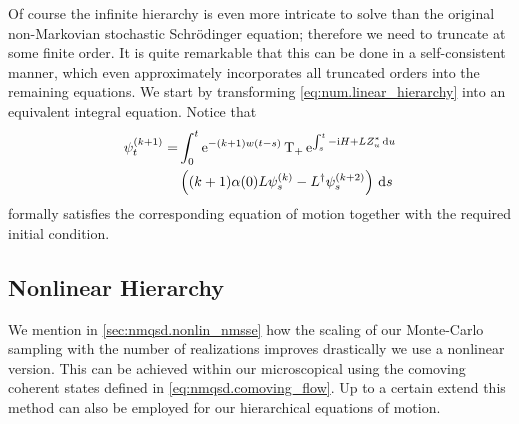 Of course the infinite hierarchy is even more intricate to solve than the original non-Markovian stochastic Schrödinger equation; therefore we need to truncate at some finite order.
It is quite remarkable that this can be done in a self-consistent manner, which even approximately incorporates all truncated orders into the remaining equations.
We start by transforming \autoref{eq:num.linear_hierarchy} into an equivalent integral equation.
Notice that
\begin{align}
  \psit[k + 1] = &\int_0^t \exp[-(k+1)w(t-s)] \Texp[\int_s^t -\ii\Hsys + L\ZZ_u \dd u] \nonumber \\
  &\left( (k+1) \alpha(0)L\psi_s^{(k)} - \adj{L} \psi_s^{(k+2)} \right) \dd s
  \label{eq:num.terminator_integral}
\end{align}
formally satisfies the corresponding equation of motion together with the required initial condition.


\subsection{Nonlinear Hierarchy}
\label{sub:num.sheom.nonlin}

We mention in \autoref{sec:nmqsd.nonlin_nmsse} how the scaling of our Monte-Carlo sampling with the number of realizations improves drastically we use a nonlinear version.
This can be achieved within our microscopical using the comoving coherent states defined in \autoref{eq:nmqsd.comoving_flow}.
Up to a certain extend this method can also be employed for our hierarchical equations of motion.

